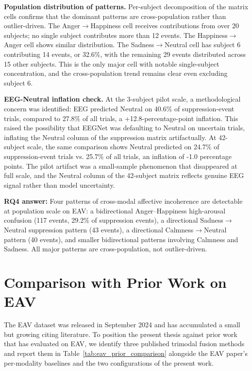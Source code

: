 \textbf{Population distribution of patterns.} Per-subject decomposition of the matrix cells confirms that the dominant patterns are cross-population rather than outlier-driven. The Anger$\rightarrow$Happiness cell receives contributions from over 20 subjects; no single subject contributes more than 12 events. The Happiness$\rightarrow$Anger cell shows similar distribution. The Sadness$\rightarrow$Neutral cell has subject 6 contributing 14 events, or 32.6\%, with the remaining 29 events distributed across 15 other subjects. This is the only major cell with notable single-subject concentration, and the cross-population trend remains clear even excluding subject 6.

\textbf{EEG-Neutral inflation check.} At the 3-subject pilot scale, a methodological concern was identified: EEG predicted Neutral on 40.6\% of suppression-event trials, compared to 27.8\% of all trials, a +12.8-percentage-point inflation. This raised the possibility that EEGNet was defaulting to Neutral on uncertain trials, inflating the Neutral column of the suppression matrix artifactually. At 42-subject scale, the same comparison shows Neutral predicted on 24.7\% of suppression-event trials vs. 25.7\% of all trials, an inflation of -1.0 percentage points. The pilot artifact was a small-sample phenomenon that disappeared at full scale, and the Neutral column of the 42-subject matrix reflects genuine EEG signal rather than model uncertainty.

\textbf{RQ4 answer:} Four patterns of cross-modal affective incoherence are detectable at population scale on EAV: a bidirectional Anger--Happiness high-arousal confusion (117 events, 29.2\% of suppression events), a directional Sadness$\rightarrow$Neutral suppression pattern (43 events), a directional Calmness$\rightarrow$Neutral pattern (40 events), and smaller bidirectional patterns involving Calmness and Sadness. All major patterns are cross-population, not outlier-driven.

\section{Comparison with Prior Work on EAV}
\label{sec:eav_prior_comparison}

The EAV dataset \cite{Lee2024EAV} was released in September 2024 and has accumulated a small but growing citing literature. To position the present thesis against prior work that has evaluated on EAV, we identify three published trimodal fusion methods and report them in Table~\ref{tab:eav_prior_comparison} alongside the EAV paper's per-modality baselines and the two configurations of the present work.


